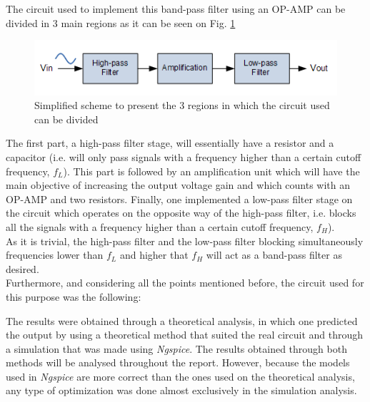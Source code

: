 The circuit used to implement this band-pass filter using an OP-AMP can be divided in 3 main regions as it can be seen on Fig. \ref{initialscheme}

\begin{figure}[H]
    \centering
    \includegraphics{esquemabunituh.PNG}
    \caption{Simplified scheme to present the 3 regions in which the circuit used can be divided}
    \label{initialscheme}
\end{figure}

The first part, a high-pass filter stage, will essentially have a resistor and a capacitor (i.e. will only pass signals with a frequency higher than a certain cutoff frequency, $f_L$). This part is followed by an amplification unit which will have the main objective of increasing the output voltage gain and which counts with an OP-AMP and two resistors. Finally, one implemented a low-pass filter stage on the circuit which operates on the opposite way of the high-pass filter, i.e. blocks all the signals with a frequency higher than a certain cutoff frequency, $f_H$). \\

As it is trivial, the high-pass filter and the low-pass filter blocking simultaneously frequencies lower than $f_L$ and higher that $f_H$ will act as a band-pass filter as desired. \\

Furthermore, and considering all the points mentioned before, the circuit used for this purpose was the following:


The results were obtained through a theoretical analysis, in which one predicted the output by using a theoretical method that suited the real circuit and through a simulation that was made using \textit{Ngspice}. The results obtained through both methods will be analysed throughout the report. However, because the models used in \textit{Ngspice} are more correct than the ones used on the theoretical analysis, any type of optimization was done almost exclusively in the simulation analysis.\\